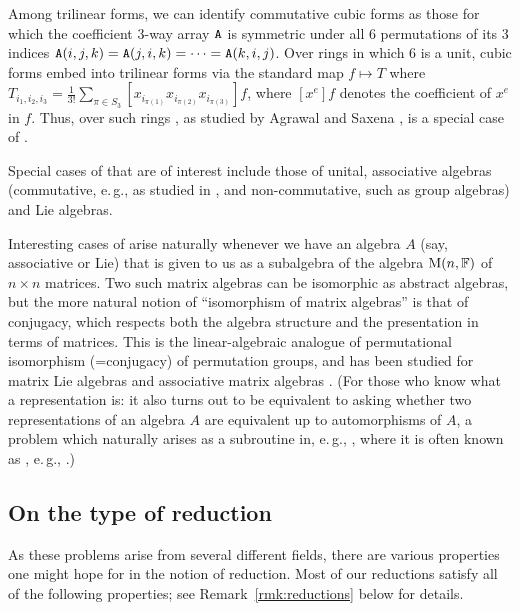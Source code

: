 \documentclass[11pt]{article}
\begin{document}
Among trilinear forms, we can identify commutative cubic forms as those 
for which the coefficient 3-way array $\mathtt{A}$ is symmetric under all 6 permutations 
of its 3 indices $\mathtt{A}(i,j,k) = \mathtt{A}(j,i,k) = \dotsb = 
\mathtt{A}(k,i,j)$. 
Over rings in which $6$ is a unit, cubic forms embed into trilinear forms via the 
standard map $f \mapsto T$ where $T_{i_1,i_2,i_3} = \frac{1}{3!} \sum_{\pi \in 
S_3} [x_{i_{\pi(1)}} x_{i_{\pi(2)}} x_{i_{\pi(3)}}] f$, where $[x^e] f$ denotes 
the coefficient of $x^e$ in $f$. Thus, over such rings \CubicFormlong, as studied 
by Agrawal and Saxena \cite{AS05, AS06}, is a special case of \NcCubicFormlong.

Special cases of \AlgIsolong that are of interest include those of unital, 
associative algebras (commutative, e.\,g., as studied in \cite{AS05, AS06, KS06}, 
and non-commutative, such as group algebras) and Lie algebras. 

Interesting cases of \MatSpConjlong arise naturally whenever we have an algebra 
$A$ (say, associative or Lie) that is given to us as a subalgebra of the algebra 
$\mathrm{M}(n,\mathbb{F})$ of $n \times n$ matrices. Two such matrix algebras can be isomorphic as 
abstract algebras, but the more natural notion of ``isomorphism of matrix 
algebras'' is that of conjugacy, which respects both the algebra structure and the 
presentation in terms of matrices. This is the linear-algebraic analogue of 
permutational isomorphism (=conjugacy) of permutation groups, and has been studied 
for matrix Lie algebras \cite{GrochowLie} and associative matrix algebras 
\cite{BW15}. (For those who know what a representation is: it also turns out to be 
equivalent to asking whether two representations of an algebra $A$ are equivalent 
up to automorphisms of $A$, a problem which naturally arises as a subroutine in, 
e.\,g., \GpIlong, where it is often known as , e.\,g., 
\cite{GQ17}.)

\subsection{On the type of reduction} \label{sec:reductions}
As these problems arise from several different fields, there are various properties one might hope for in the notion of reduction. Most of our reductions satisfy all of the following properties; see Remark~\ref{rmk:reductions} below for details.
\end{document}
